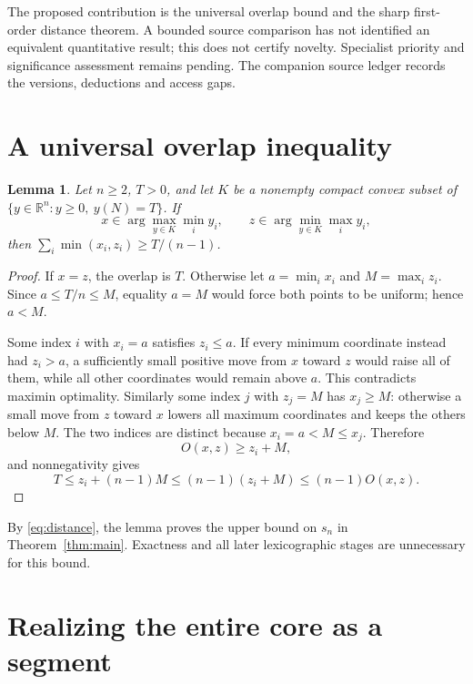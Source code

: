 \documentclass[11pt]{article}
\newtheorem{lemma}[theorem]{Lemma}
\begin{document}
The proposed contribution is the universal overlap bound and the sharp
first-order distance theorem. A bounded source comparison has not identified
an equivalent quantitative result; this does not certify novelty.
Specialist priority and significance assessment remains pending. The
companion source ledger records the versions, deductions and access gaps.

\section{A universal overlap inequality}

\begin{lemma}\label{lem:overlap}
Let $n\ge2$, $T>0$, and let $K$ be a nonempty compact convex subset of
$\{y\in\mathbb R^n:y\ge0,\ y(N)=T\}$. If
\[
 x\in\arg\max_{y\in K}\min_i y_i,
 \qquad z\in\arg\min_{y\in K}\max_i y_i,
\]
then $\sum_i\min(x_i,z_i)\ge T/(n-1)$.
\end{lemma}

\begin{proof}
If $x=z$, the overlap is $T$. Otherwise let $a=\min_i x_i$ and
$M=\max_i z_i$. Since $a\le T/n\le M$, equality $a=M$ would force
both points to be uniform; hence $a<M$.

Some index $i$ with $x_i=a$ satisfies $z_i\le a$. If every minimum
coordinate instead had $z_i>a$, a sufficiently small positive move from
$x$ toward $z$ would raise all of them, while all other coordinates would
remain above $a$. This contradicts maximin optimality. Similarly some
index $j$ with $z_j=M$ has $x_j\ge M$: otherwise a small move from $z$
toward $x$ lowers all maximum coordinates and keeps the others below $M$.
The two indices are distinct because $x_i=a<M\le x_j$. Therefore
\[
 O(x,z)\ge z_i+M,
\]
and nonnegativity gives
\[
 T\le z_i+(n-1)M
   \le(n-1)(z_i+M)
   \le(n-1)O(x,z).
\]
\end{proof}

By \eqref{eq:distance}, the lemma proves the upper bound on $s_n$ in
Theorem~\ref{thm:main}. Exactness and all later lexicographic stages are
unnecessary for this bound.

\section{Realizing the entire core as a segment}
\end{document}
